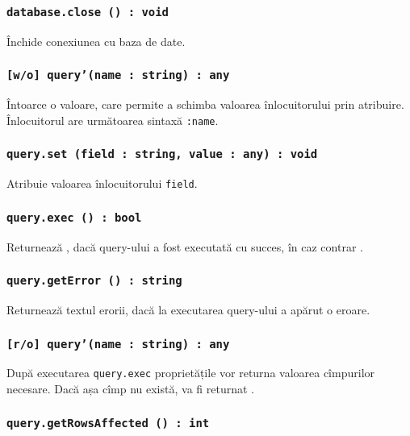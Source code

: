 \subsubsection{\texttt{database.close () : void}}

Închide conexiunea cu baza de date.

\subsubsection{\texttt{[w/o] query'(name : string) : any}}

Întoarce o valoare, care permite a schimba valoarea înlocuitorului prin atribuire. Înlocuitorul are următoarea sintaxă \texttt{:name}.

\subsubsection{\texttt{query.set (field : string, value : any) : void}}

Atribuie valoarea înlocuitorului \texttt{field}.

\subsubsection{\texttt{query.exec () : bool}}

Returnează \true, dacă query-ului a fost executată cu succes, în caz contrar \false.

\subsubsection{\texttt{query.getError () : string}}

Returnează textul erorii, dacă la executarea query-ului a apărut o eroare.

\subsubsection{\texttt{[r/o] query'(name : string) : any}}

După executarea \texttt{query.exec} proprietățile vor returna valoarea cîmpurilor necesare. Dacă așa cîmp nu există, va fi returnat \void.

\subsubsection{\texttt{query.getRowsAffected () : int}}


